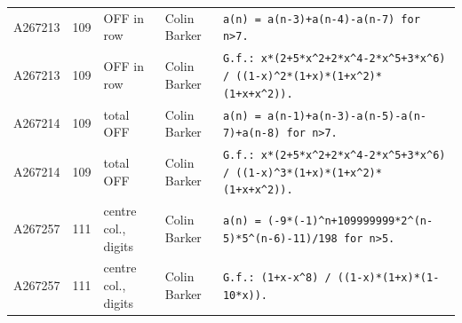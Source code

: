 \documentclass[11pt]{article}
\theoremstyle{definition}
\theoremstyle{remark}
\begin{document}
{\begin{longtable}{p{1.3cm}p{0.7cm}p{2.4cm}p{2.3cm}p{7.3cm}}
A267213 & 109 & OFF in row & Colin Barker & \texttt{a(n)\allowbreak{} \allowbreak{}=\allowbreak{} \allowbreak{}a(n-\allowbreak{}3)\allowbreak{}+\allowbreak{}a(n-\allowbreak{}4)\allowbreak{}-\allowbreak{}a(n-\allowbreak{}7)\allowbreak{} \allowbreak{}for \allowbreak{}n>7.} \\
A267213 & 109 & OFF in row & Colin Barker & \texttt{G.f.: \allowbreak{}x*\allowbreak{}(2+\allowbreak{}5*\allowbreak{}x\^{}2+\allowbreak{}2*\allowbreak{}x\^{}4-\allowbreak{}2*\allowbreak{}x\^{}5+\allowbreak{}3*\allowbreak{}x\^{}6)\allowbreak{} \allowbreak{}/\allowbreak{} \allowbreak{}((1-\allowbreak{}x)\allowbreak{}\^{}2*\allowbreak{}(1+\allowbreak{}x)\allowbreak{}*\allowbreak{}(1+\allowbreak{}x\^{}2)\allowbreak{}*\allowbreak{}(1+\allowbreak{}x+\allowbreak{}x\^{}2)\allowbreak{})\allowbreak{}.} \\
A267214 & 109 & total OFF & Colin Barker & \texttt{a(n)\allowbreak{} \allowbreak{}=\allowbreak{} \allowbreak{}a(n-\allowbreak{}1)\allowbreak{}+\allowbreak{}a(n-\allowbreak{}3)\allowbreak{}-\allowbreak{}a(n-\allowbreak{}5)\allowbreak{}-\allowbreak{}a(n-\allowbreak{}7)\allowbreak{}+\allowbreak{}a(n-\allowbreak{}8)\allowbreak{} \allowbreak{}for \allowbreak{}n>7.} \\
A267214 & 109 & total OFF & Colin Barker & \texttt{G.f.: \allowbreak{}x*\allowbreak{}(2+\allowbreak{}5*\allowbreak{}x\^{}2+\allowbreak{}2*\allowbreak{}x\^{}4-\allowbreak{}2*\allowbreak{}x\^{}5+\allowbreak{}3*\allowbreak{}x\^{}6)\allowbreak{} \allowbreak{}/\allowbreak{} \allowbreak{}((1-\allowbreak{}x)\allowbreak{}\^{}3*\allowbreak{}(1+\allowbreak{}x)\allowbreak{}*\allowbreak{}(1+\allowbreak{}x\^{}2)\allowbreak{}*\allowbreak{}(1+\allowbreak{}x+\allowbreak{}x\^{}2)\allowbreak{})\allowbreak{}.} \\
A267257 & 111 & centre col., digits & Colin Barker & \texttt{a(n)\allowbreak{} \allowbreak{}=\allowbreak{} \allowbreak{}(-\allowbreak{}9*\allowbreak{}(-\allowbreak{}1)\allowbreak{}\^{}n+\allowbreak{}109999999*\allowbreak{}2\^{}(n-\allowbreak{}5)\allowbreak{}*\allowbreak{}5\^{}(n-\allowbreak{}6)\allowbreak{}-\allowbreak{}11)\allowbreak{}/\allowbreak{}198 \allowbreak{}for \allowbreak{}n>5.} \\
A267257 & 111 & centre col., digits & Colin Barker & \texttt{G.f.: \allowbreak{}(1+\allowbreak{}x-\allowbreak{}x\^{}8)\allowbreak{} \allowbreak{}/\allowbreak{} \allowbreak{}((1-\allowbreak{}x)\allowbreak{}*\allowbreak{}(1+\allowbreak{}x)\allowbreak{}*\allowbreak{}(1-\allowbreak{}10*\allowbreak{}x)\allowbreak{})\allowbreak{}.} \\

\end{longtable}}
\end{document}
